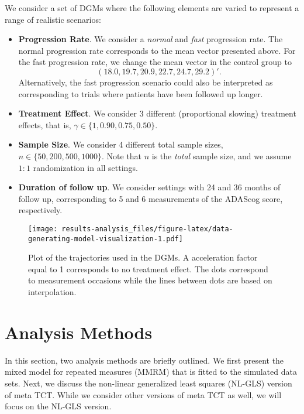 \documentclass[
]{article}
\providecommand{\tightlist}{%
  \setlength{\itemsep}{0pt}\setlength{\parskip}{0pt}}
\begin{document}
We consider a set of DGMs where the following elements are varied to represent
a range of realistic scenarios:

\begin{itemize}
\tightlist
\item
  \textbf{Progression Rate}. We consider a \emph{normal} and \emph{fast} progression rate. The
  normal progression rate corresponds to the mean vector presented above. For the
  fast progression rate, we change the mean vector in the control group to
  \[(18.0, 19.7, 20.9, 22.7, 24.7, 29.2)'.\] Alternatively, the fast progression
  scenario could also be interpreted as corresponding to trials where patients have
  been followed up longer.
\item
  \textbf{Treatment Effect}. We consider 3 different (proportional slowing) treatment
  effects, that is, \(\gamma \in \{1, 0.90, 0.75, 0.50 \}\).
\item
  \textbf{Sample Size}. We consider 4 different total sample sizes, \(n \in \{50, 200, 500, 1000\}\).
  Note that \(n\) is the \emph{total} sample size, and we assume \(1:1\) randomization in all settings.
\item
  \textbf{Duration of follow up}. We consider settings with 24 and 36 months of follow up,
  corresponding to 5 and 6 measurements of the ADAScog score, respectively.
\end{itemize}

\begin{figure}
\centering
\texttt{[image: results-analysis\_files/figure-latex/data-generating-model-visualization-1.pdf]}
\caption{\label{fig:data-generating-model-visualization}Plot of the trajectories used in the DGMs. A acceleration factor equal to 1 corresponds to no treatment effect. The dots correspond to measurement occasions while the lines between dots are based on interpolation.}
\end{figure}

\hypertarget{analysis-methods}{%
\section{Analysis Methods}\label{analysis-methods}}

In this section, two analysis methods are briefly outlined. We first present the
mixed model for repeated measures (MMRM) that is fitted to the simulated data
sets. Next, we discuss the non-linear generalized least squares (NL-GLS) version
of meta TCT. While we consider other versions of meta TCT as well, we will focus
on the NL-GLS version.
\end{document}

